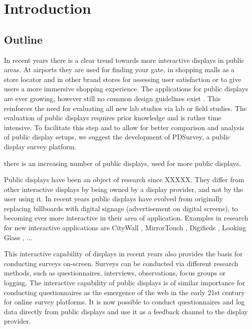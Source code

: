 \section{Introduction}
\label{sec:introduction}


\subsection{Outline}

	In recent years there is a clear trend towards more interactive displays in public areas. At airports they are used for finding your gate, in shopping malls as a store locator and in other brand stores for assessing user satisfaction or to give users a more immersive shopping experience. The applications for public displays are ever growing, however still no common design guidelines exist \cite{Alt2012HowToEvaluate}. This reinforces the need for evaluating all new lab studies via lab or field studies. The evaluation of public displays requires prior knowledge and is rather time intensive. To facilitate this step and to allow for better comparison and analysis of public display setups, we suggest the development of PDSurvey, a public display survey platform.

			there is an increasing number of public displays, used for more public displays.

	Public displays have been an object of research since XXXXX. They differ from other interactive displays by being owned by a display provider, and not by the user using it. In recent years public displays have evolved from originally replacing billboards with digital signage (advertisement on digital screens), to becoming ever more interactive in their area of application. Examples in research for new interactive applications are CityWall \cite{peltonen2008s}, MirrorTouch \cite{muller2014mirrortouch}, Digifieds \cite{}, Looking Glass \cite{}, ...

	This interactive capability of displays in recent years also provides the basis for conducting surveys on-screen. Surveys can be conducted via different research methods, such as questionnaires, interviews, observations, focus groups or logging. The interactive capability of public displays is of similar importance for conducting questionnaires as the emergence of the web in the early 21st century for online survey platforms. It is now possible to conduct questionnaires and log data directly from public displays and use it as a feedback channel to the display provider.

